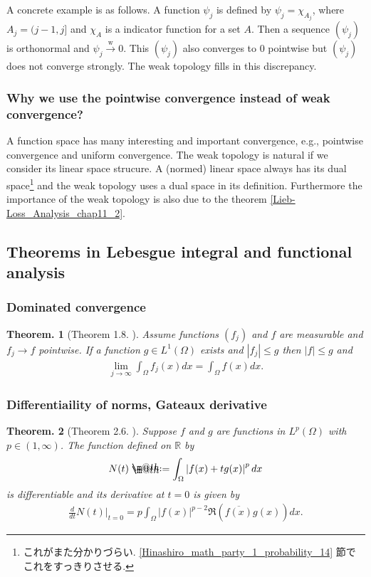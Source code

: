 \documentclass[openany, a4paper, oneside]{book}
\makeatletter
\newcommand*{\defeq}{\mathrel{\rlap{%
\raisebox{0.3ex}{$\m@th\cdot$}}%
\raisebox{-0.3ex}{$\m@th\cdot$}}%
=}
\theoremstyle{break}
\newtheorem{thm}{Theorem.}[section]
\theoremstyle{breakdefn}
\newcommand{\abs}[1]{\left|#1\right|}
\newcommand{\rbk}[1]{\left (#1\right)}
\newcommand{\bbR}{\mathbb{R}}
\newcommand{\wto}{\xrightarrow{\text{w}}}
\makeatother
\begin{document}
A concrete example is as follows.
A function $\psi_j$ is defined by $\psi_j = \chi_{A_j}$, where $A_j = (j-1, j]$ and $\chi_A$ is a indicator function for a set $A$.
Then a sequence $(\psi_j)$ is orthonormal and $\psi_j \wto 0$.
This $(\psi_j)$ also converges to $0$ pointwise but $(\psi_j)$ does not converge strongly.
The weak topology fills in this discrepancy.
\subsubsection{Why we use the pointwise convergence instead of weak convergence?}
\label{sec-7-10-2-5-3}

A function space has many interesting and important convergence, e.g., pointwise convergence and uniform convergence.
The weak topology is natural if we consider its linear space strucure.
A (normed) linear space always has its dual space\footnote{これがまた分かりづらい. \ref{Hinashiro_math_party_1_probability_14} 節でこれをすっきりさせる.
 } and the weak topology uses a dual space in its definition.
Furthermore the importance of the weak topology is also due to the theorem \ref{Lieb-Loss_Analysis_chap11_2}.
\subsection{Theorems in Lebesgue integral and functional analysis}
\label{sec-7-10-2-6}
\subsubsection{Dominated convergence}
\label{sec-7-10-2-6-1}

\begin{thm}[Theorem 1.8. \cite{LiebLoss1}]\label{Lieb-Loss_Analysis_chap11_6}
 Assume functions $(f_j)$ and $f$ are measurable and $f_j \to f$ pointwise.
 If a function $g \in L^1 (\Omega)$ exists and $\abs{f_j} \leq g$ then $\abs{f} \leq g$ and
 \begin{align}
  \lim_{j \to \infty} \int_{\Omega} f_j (x) dx
  =
  \int_{\Omega} f (x) dx.
 \end{align}
\end{thm}
\subsubsection{Differentiaility of norms, Gateaux derivative}
\label{sec-7-10-2-6-2}

\begin{thm}[Theorem 2.6. \cite{LiebLoss1}]\label{Lieb-Loss_Analysis_chap11_26}
 Suppose $f$ and $g$ are functions in $L^p (\Omega)$ with $p \in \rbk{1, \infty}$.
 The function defined on $\bbR$ by
 \begin{align}
  N (t)
  \defeq
  \int_{\Omega} \abs{f (x) + t g (x)}^{p} dx
 \end{align}
 is differentiable and its derivative at $t = 0$ is given by
 \begin{align}
  \frac{d}{dt} N (t) \Big |_{t=0}
  =
  p \int_{\Omega} \abs{f (x)}^{p-2} \Re \rbk{\overline{f (x)} g (x)} dx.
 \end{align}
\end{thm}
\end{document}
